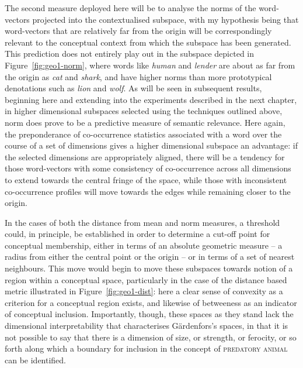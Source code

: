 The second measure deployed here will be to analyse the norms of the word-vectors projected into the contextualised subspace, with my hypothesis being that word-vectors that are relatively far from the origin will be correspondingly relevant to the conceptual context from which the subspace has been generated.  This prediction does not entirely play out in the subspace depicted in Figure~\ref{fig:geo1-norm}, where words like \emph{human} and \emph{lender} are about as far from the origin as \emph{cat} and \emph{shark}, and have higher norms than more prototypical denotations such as \emph{lion} and \emph{wolf}.  As will be seen in subsequent results, beginning here and extending into the experiments described in the next chapter, in higher dimensional subspaces selected using the techniques outlined above, norm does prove to be a predictive measure of semantic relevance.  Here again, the preponderance of co-occurrence statistics associated with a word over the course of a set of dimensions gives a higher dimensional subspace an advantage: if the selected dimensions are appropriately aligned, there will be a tendency for those word-vectors with some consistency of co-occurrence across all dimensions to extend towards the central fringe of the space, while those with inconsistent co-occurrence profiles will move towards the edges while remaining closer to the origin.

In the cases of both the distance from mean and norm measures, a threshold could, in principle, be established in order to determine a cut-off point for conceptual membership, either in terms of an absolute geometric measure -- a radius from either the central point or the origin -- or in terms of a set of nearest neighbours.  This move would begin to move these subspaces towards  notion of a region within a conceptual space, particularly in the case of the distance based metric illustrated in Figure~\ref{fig:geo1-dist}: here a clear sense of convexity as a criterion for a conceptual region exists, and likewise of betweeness as an indicator of conceptual inclusion.  Importantly, though, these spaces as they stand lack the dimensional interpretability that characterises G\"{a}rdenfors's spaces, in that it is not possible to say that there is a dimension of size, or strength, or ferocity, or so forth along which a boundary for inclusion in the concept of \textsc{predatory animal} can be identified.

